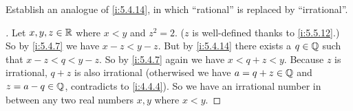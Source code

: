 \begin{ex}\label{i:ex:5.5.5}
  Establish an analogue of \cref{i:5.4.14}, in which ``rational'' is replaced by ``irrational''.
\end{ex}

\begin{proof}[]
  Let \(x, y, z \in \mathbb{R}\) where \(x < y\) and \(z^2 = 2\).
  (\(z\) is well-defined thanks to \cref{i:5.5.12}.)
  So by \cref{i:5.4.7} we have \(x - z < y - z\).
  But by \cref{i:5.4.14} there exists a \(q \in \mathbb{Q}\) such that \(x - z < q < y - z\).
  So by \cref{i:5.4.7} again we have \(x < q + z < y\).
  Because \(z\) is irrational, \(q + z\) is also irrational
  (otherwised we have \(a = q + z \in \mathbb{Q}\) and \(z = a - q \in \mathbb{Q}\), contradicts to \cref{i:4.4.4}).
  So we have an irrational number in between any two real numbers \(x, y\) where \(x < y\).
\end{proof}
